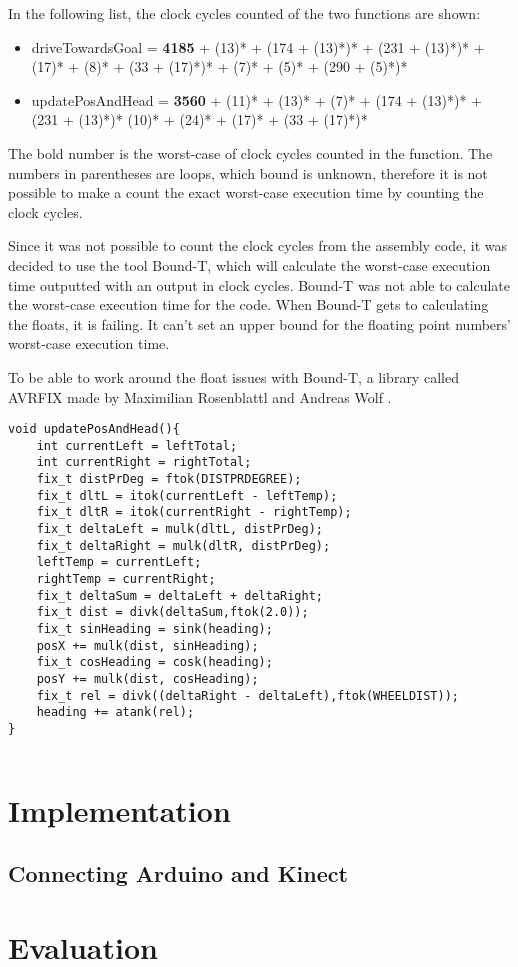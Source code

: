 In the following list, the clock cycles counted of the two functions are shown:
\begin{itemize}
	\item driveTowardsGoal = \textbf{4185} + (13)* + (174 + (13)*)* + (231 + (13)*)* + (17)* + (8)* + (33 + (17)*)* + (7)* + (5)* + (290 + (5)*)*
	\item updatePosAndHead = \textbf{3560} + (11)* + (13)* + (7)* + (174 + (13)*)* + (231 + (13)*)* (10)* + (24)* + (17)* + (33 + (17)*)*
\end{itemize}
The bold number is the worst-case of clock cycles counted in the function. The numbers in parentheses are loops, which bound is unknown, therefore it is not possible to make a count the exact worst-case execution time by counting the clock cycles.

Since it was not possible to count the clock cycles from the assembly code, it was decided to use the tool Bound-T, which will calculate the worst-case execution time outputted with an output in clock cycles. \newline
Bound-T was not able to calculate the worst-case execution time for the code. When Bound-T gets to calculating the floats, it is failing. It can't set an upper bound for the floating point numbers' worst-case execution time. 

To be able to work around the float issues with Bound-T, a library called AVRFIX made by Maximilian Rosenblattl and Andreas Wolf \citep{AVRFIX}. 

\begin{lstlisting}[caption={The function updatePosAndHead with AWRFIX library}, label={Update1}]
void updatePosAndHead(){
	int currentLeft = leftTotal;
	int currentRight = rightTotal;
	fix_t distPrDeg = ftok(DISTPRDEGREE);
	fix_t dltL = itok(currentLeft - leftTemp);
	fix_t dltR = itok(currentRight - rightTemp);
	fix_t deltaLeft = mulk(dltL, distPrDeg);
	fix_t deltaRight = mulk(dltR, distPrDeg);
	leftTemp = currentLeft;
	rightTemp = currentRight;
	fix_t deltaSum = deltaLeft + deltaRight;
	fix_t dist = divk(deltaSum,ftok(2.0));
	fix_t sinHeading = sink(heading);
	posX += mulk(dist, sinHeading);
	fix_t cosHeading = cosk(heading);
	posY += mulk(dist, cosHeading);
	fix_t rel = divk((deltaRight - deltaLeft),ftok(WHEELDIST));
	heading += atank(rel);
}
\end{lstlisting}

\begin{lstlisting}[caption={The function updatePosAndHead from the Arduino IDE}, label={Update2}]

\end{lstlisting}

\section{Implementation}
\label{sec:i3Implementation}

\subsection{Connecting Arduino and Kinect}
\label{sec:i3Connecting Arduino and Kinect implementation}

\section{Evaluation}
\label{sec:i3Evaluation}
